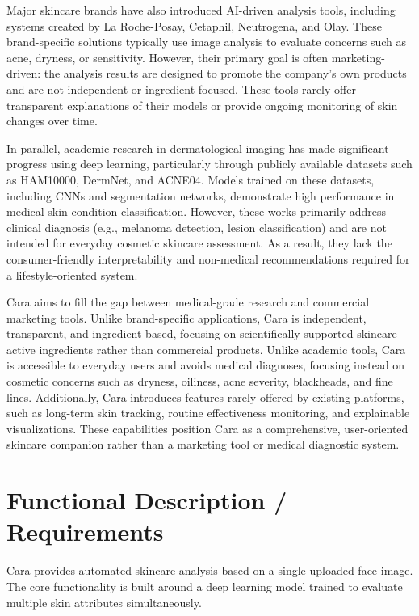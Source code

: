 \documentclass[12pt,a4paper]{article}
\begin{document}
Major skincare brands have also introduced AI-driven analysis tools, including systems created by La Roche-Posay, Cetaphil, Neutrogena, and Olay. These brand-specific solutions typically use image analysis to evaluate concerns such as acne, dryness, or sensitivity. However, their primary goal is often marketing-driven: the analysis results are designed to promote the company's own products and are not independent or ingredient-focused. These tools rarely offer transparent explanations of their models or provide ongoing monitoring of skin changes over time.

In parallel, academic research in dermatological imaging has made significant progress using deep learning, particularly through publicly available datasets such as HAM10000, DermNet, and ACNE04. Models trained on these datasets, including CNNs and segmentation networks, demonstrate high performance in medical skin-condition classification. However, these works primarily address clinical diagnosis (e.g., melanoma detection, lesion classification) and are not intended for everyday cosmetic skincare assessment. As a result, they lack the consumer-friendly interpretability and non-medical recommendations required for a lifestyle-oriented system.

Cara aims to fill the gap between medical-grade research and commercial marketing tools. Unlike brand-specific applications, Cara is independent, transparent, and ingredient-based, focusing on scientifically supported skincare active ingredients rather than commercial products. Unlike academic tools, Cara is accessible to everyday users and avoids medical diagnoses, focusing instead on cosmetic concerns such as dryness, oiliness, acne severity, blackheads, and fine lines. Additionally, Cara introduces features rarely offered by existing platforms, such as long-term skin tracking, routine effectiveness monitoring, and explainable visualizations. These capabilities position Cara as a comprehensive, user-oriented skincare companion rather than a marketing tool or medical diagnostic system.

\section{Functional Description / Requirements}
Cara provides automated skincare analysis based on a single uploaded face image. The core functionality is built around a deep learning model trained to evaluate multiple skin attributes simultaneously.
\end{document}

